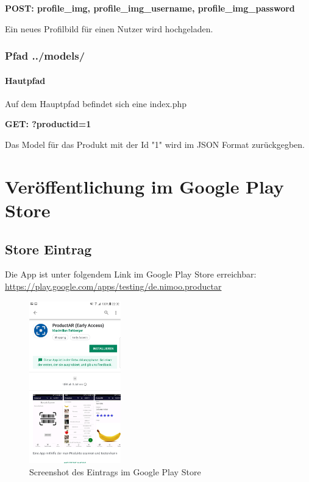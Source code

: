 \documentclass{scrartcl}
\begin{document}
\noindent \textbf{POST: profile\_img, profile\_img\_username, profile\_img\_password}

\noindent Ein neues Profilbild für einen Nutzer wird hochgeladen.


\subsubsection{Pfad ../models/}

\paragraph{Hautpfad}
 
Auf dem Hauptpfad befindet sich eine index.php \newline 

\noindent \textbf{GET: ?productid=1}

\noindent  Das Model für das Produkt mit der Id "1" wird im JSON Format zurückgegben.

\newpage

\section{Veröffentlichung im Google Play Store}

\subsection{Store Eintrag}

Die App ist unter folgendem Link im Google Play Store erreichbar: \newline \url{https://play.google.com/apps/testing/de.nimoo.productar}

\begin{figure}[h]
\centering
\includegraphics[width=150px]{img/store_screenshot.png}
\caption{Screenshot des Eintrags im Google Play Store}
\end{figure}
\end{document}
